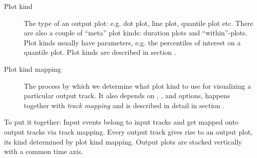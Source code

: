 \documentclass{article}
\begin{document}
\begin{description}
\item[Plot kind] The type of an output plot: e.g. dot plot, line plot, quantile plot etc. There are also a couple of ``meta'' plot kinds: duration plots and ``within''-plots. Plot kinds usually have parameters, e.g. the percentiles of interest on a quantile plot. Plot kinds are described in section .
\item[Plot kind mapping] The process by which we determine what plot kind to use for visualizing a particular output track. It also depends on , ,  and  options, happens together with \emph{track mapping} and is described in detail in section .
\end{description}

To put it together: Input events belong to input tracks and get mapped onto output tracks via track mapping. Every output track gives rise to an output plot, its kind determined by plot kind mapping. Output plots are stacked vertically with a common time axis.
\end{document}
